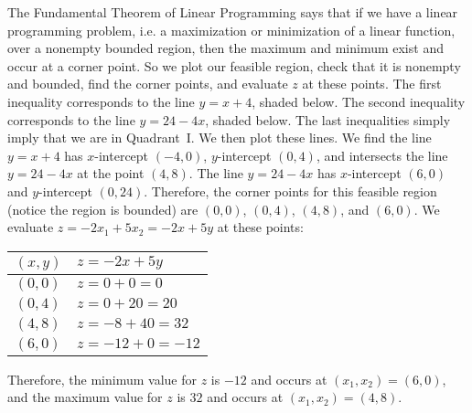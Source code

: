 \documentclass[11pt,letterpaper]{article}
\begin{document}
\sol The Fundamental Theorem of Linear Programming says that if we have a linear programming problem, i.e. a maximization or minimization of a linear function, over a nonempty bounded region, then the maximum and minimum exist and occur at a corner point. So we plot our feasible region, check that it is nonempty and bounded, find the corner points, and evaluate $z$ at these points. The first inequality corresponds to the line $y= x + 4$, shaded below. The second inequality corresponds to the line $y= 24 - 4x$, shaded below. The last inequalities simply imply that we are in Quadrant~I. We then plot these lines. We find the line $y= x + 4$ has $x$-intercept $(-4, 0)$, $y$-intercept $(0, 4)$, and intersects the line $y= 24 - 4x$ at the point $(4,8)$. The line $y= 24 - 4x$ has $x$-intercept $(6, 0)$ and $y$-intercept $(0, 24)$. Therefore, the corner points for this feasible region (notice the region is bounded) are $(0, 0)$, $(0, 4)$, $(4, 8)$, and $(6, 0)$. We evaluate $z= -2x_1 + 5x_2= -2x + 5y$ at these points:
	\begin{table}[!ht]
	\centering
	\begin{tabular}{l|l}
	$(x, y)$ & $z= -2x + 5y$ \\ \hline
	$(0, 0)$ & $z= 0 + 0= 0$ \\
	$(0, 4)$ & $z= 0 + 20= 20$ \\
	$(4, 8)$ & $z= -8 + 40= 32$ \\
	$(6, 0)$ & $z= -12 + 0= -12$
	\end{tabular}
	\end{table} \par	
Therefore, the minimum value for $z$ is $-12$ and occurs at $(x_1, x_2)= (6, 0)$, and the maximum value for $z$ is $32$ and occurs at $(x_1, x_2)= (4, 8)$. 
\end{document}
